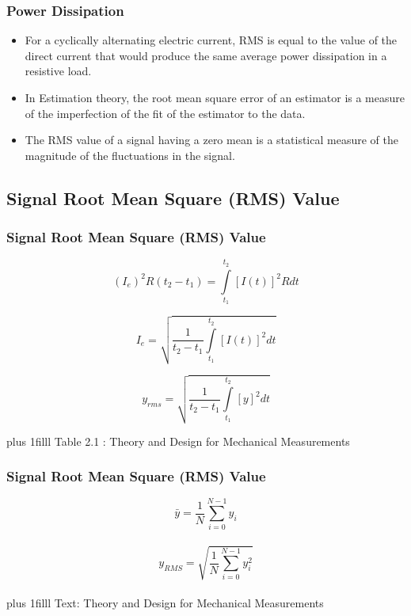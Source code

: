 \documentclass[fleqn]{beamer} %
\newcommand{\sectionIIsubsectionIItitle}{Power Dissipation}
\newcommand{\sectionIIsubsectionIIItitle}{Signal Root Mean Square (RMS) Value}
\newcommand{\btVFill}{\vskip0pt plus 1filll}
\begin{document}
			\begin{frame}
				\frametitle{\sectionIIsubsectionIItitle}


	\begin{itemize}
	\item For a cyclically alternating electric current, RMS is equal to the value of the direct current that would produce the same average power dissipation in a resistive load.
	\item In Estimation theory, the root mean square error of an estimator is a measure of the imperfection of the fit of the estimator to the data.  
	\item The RMS value of a signal having a zero mean is a statistical measure of the magnitude of the fluctuations in the signal.
	\end{itemize}


			\end{frame}

		\subsection{\sectionIIsubsectionIIItitle}\label{sectionIIsubsectionIII}

			\begin{frame}
				\frametitle{\sectionIIsubsectionIIItitle}

				\bigskip

\[(I_e)^2R(t_2-t_1)=\int\limits_{t_1}^{t_2}[I(t)]^2R dt\]

\[I_e = \sqrt{\frac{1}{t_2-t_1}\int\limits_{t_1}^{t_2}[I(t)]^2 dt} \]

\vspace{10mm}

\[y_{rms} = \sqrt{\frac{1}{t_2-t_1}\int\limits_{t_1}^{t_2}[y]^2 dt} \]


\btVFill
\tiny{Table 2.1 : Theory and Design for Mechanical Measurements}


			\end{frame}

			\begin{frame}
				\frametitle{\sectionIIsubsectionIIItitle}

\bigskip

\[\bar{y}=\frac{1}{N}\sum\limits_{i=0}^{N-1} y_i\] \vspace{10mm}\\	
\[y_{RMS}=\sqrt{\frac{1}{N}\sum\limits_{i=0}^{N-1} y_i^2}\] \vspace{10mm}\\	

\btVFill
\tiny{Text: Theory and Design for Mechanical Measurements}	
			

			\end{frame}
\end{document}
